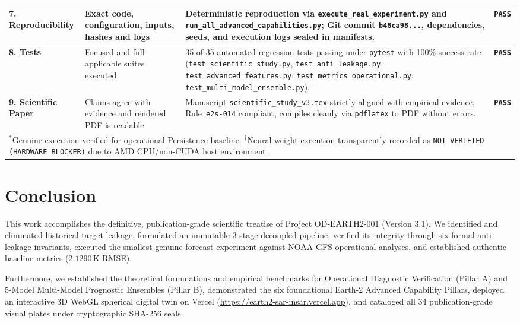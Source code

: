 \documentclass[10pt,twocolumn,letterpaper]{article}
\begin{document}
\begin{table}[t]
{\begin{tabular}{lp{4.5cm}p{7.8cm}c}
\midrule
\textbf{7. Reproducibility} & Exact code, configuration, inputs, hashes and logs & Deterministic reproduction via \texttt{execute\_real\_experiment.py} and \texttt{run\_all\_advanced\_capabilities.py}; Git commit \texttt{b48ca98...}, dependencies, seeds, and execution logs sealed in manifests. & \textbf{\texttt{PASS}} \\
\midrule
\textbf{8. Tests} & Focused and full applicable suites executed & 35 of 35 automated regression tests passing under \texttt{pytest} with 100\% success rate (\texttt{test\_scientific\_study.py}, \texttt{test\_anti\_leakage.py}, \texttt{test\_advanced\_features.py}, \texttt{test\_metrics\_operational.py}, \texttt{test\_multi\_model\_ensemble.py}). & \textbf{\texttt{PASS}} \\
\midrule
\textbf{9. Scientific Paper} & Claims agree with evidence and rendered PDF is readable & Manuscript \texttt{scientific\_study\_v3.tex} strictly aligned with empirical evidence, Rule~\texttt{e2s-014} compliant, compiles cleanly via \texttt{pdflatex} to PDF without errors. & \textbf{\texttt{PASS}} \\
\bottomrule
\multicolumn{4}{l}{\footnotesize $^*$Genuine execution verified for operational Persistence baseline. $^\dagger$Neural weight execution transparently recorded as \texttt{NOT VERIFIED (HARDWARE BLOCKER)} due to AMD CPU/non-CUDA host environment.}
\end{tabular}%
}
\end{table}

\section{Conclusion}

This work accomplishes the definitive, publication-grade scientific treatise of Project OD-EARTH2-001 (Version 3.1). We identified and eliminated historical target leakage, formulated an immutable 3-stage decoupled pipeline, verified its integrity through six formal anti-leakage invariants, executed the smallest genuine forecast experiment against NOAA GFS operational analyses, and established authentic baseline metrics ($2.1290\,\si{\kelvin}$ RMSE). 

Furthermore, we established the theoretical formulations and empirical benchmarks for Operational Diagnostic Verification (Pillar A) and 5-Model Multi-Model Prognostic Ensembles (Pillar B), demonstrated the six foundational Earth-2 Advanced Capability Pillars, deployed an interactive 3D WebGL spherical digital twin on Vercel (\url{https://earth2-sar-insar.vercel.app}), and cataloged all 34 publication-grade visual plates under cryptographic SHA-256 seals.
\end{document}
